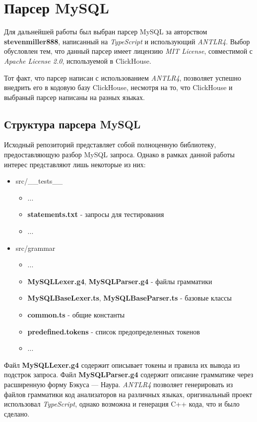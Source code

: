 \section{Парсер MySQL}
Для дальнейшей работы был выбран парсер MySQL за авторством \textbf{stevenmiller888}, написанный на \textit{TypeScript} и использующий \textit{ANTLR4}. Выбор обусловлен тем, что данный парсер имеет лицензию \textit{MIT License}, совместимой с \textit{Apache License 2.0}, используемой в ClickHouse.

Тот факт, что парсер написан с использованием \textit{ANTLR4}, позволяет успешно внедрить его в кодовую базу ClickHouse, несмотря на то, что ClickHouse и выбраный парсер написаны на разных языках.

\subsection{Структура парсера MySQL}
Исходный репозиторий представляет собой полноценную библиотеку, предоставляющую разбор MySQL запроса. Однако в рамках данной работы интерес представляют лишь некоторые из них:
\begin{itemize}
    \item src/\_\_tests\_\_
    \begin{itemize}
        \item ...
        \item \textbf{statements.txt} - запросы для тестирования
        \item ...
    \end{itemize}
    \item src/grammar
    \begin{itemize}
        \item ...
        \item \textbf{MySQLLexer.g4}, \textbf{MySQLParser.g4} - файлы грамматики
        \item \textbf{MySQLBaseLexer.ts}, \textbf{MySQLBaseParser.ts} - базовые классы
        \item \textbf{common.ts} - общие константы
        \item \textbf{predefined.tokens} - список предопределенных токенов
        \item ...
    \end{itemize}
\end{itemize}

\pagebreak

Файл \textbf{MySQLLexer.g4} содержит описывает токены и правила их вывода из подстрок запроса. Файл \textbf{MySQLParser.g4} содержит описание грамматике через расширенную форму Бэкуса — Наура. \textit{ANTLR4} позволяет генерировать из файлов грамматики код анализаторов на различных языках, оригинальный проект использовал \textit{TypeScript}, однако возможна и генерация C++ кода, что и было сделано.

